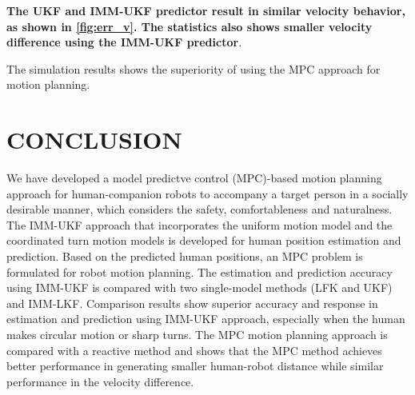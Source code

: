 \documentclass[letterpaper, 10 pt, conference]{ieeeconf}
\begin{document}
\textbf{The UKF and IMM-UKF predictor result in similar velocity behavior, as shown in \cref{fig:err_v}. The statistics also shows smaller velocity difference using the IMM-UKF predictor}.

The simulation results shows the superiority of using the MPC approach for motion planning.

\section{CONCLUSION}\label{sec:conclusion}
We have developed a model predictve control (MPC)-based motion planning approach for human-companion robots to accompany a target person in a socially desirable manner, which considers the safety, comfortableness and naturalness.
The IMM-UKF approach that incorporates the uniform motion model and the coordinated turn motion models is developed for human position estimation and prediction.
Based on the predicted human positions, an MPC problem is formulated for robot motion planning.
The estimation and prediction accuracy using IMM-UKF is compared with two single-model methods (LFK and UKF) and IMM-LKF.
Comparison results show superior accuracy and response in estimation and prediction using IMM-UKF approach, especially when the human makes circular motion or sharp turns.
The MPC motion planning approach is compared with a reactive method and shows that the MPC method achieves better performance in generating smaller human-robot distance while similar performance in the velocity difference.
\end{document}
